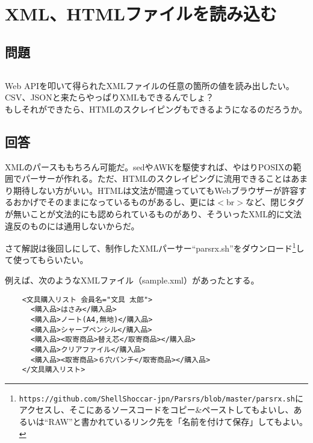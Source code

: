 \section{XML、HTMLファイルを読み込む}
\label{recipe:XML_parser}

\subsection*{問題}
\noindent
$\!\!\!\!\!$
\begin{grshfboxit}{160.0mm}
	Web APIを叩いて得られたXMLファイルの任意の箇所の値を読み出したい。CSV、JSONと来たらやっぱりXMLもできるんでしょ？\\
	もしそれができたら、HTMLのスクレイピングもできるようになるのだろうか。
\end{grshfboxit}

\subsection*{回答}
XMLのパースももちろん可能だ。sedやAWKを駆使すれば、やはりPOSIXの範囲でパーサーが作れる。ただ、HTMLのスクレイピングに流用できることはあまり期待しない方がいい。HTMLは文法が間違っていてもWebブラウザーが許容するおかげでそのままになっているものがあるし、更には$<$br$>$など、閉じタグが無いことが文法的にも認められているものがあり、そういったXML的に文法違反のものには通用しないからだ。

さて解説は後回しにして、制作したXMLパーサー``parsrx.sh''をダウンロード\footnote{\verb|https://github.com/ShellShoccar-jpn/Parsrs/blob/master/parsrx.sh|にアクセスし、そこにあるソースコードをコピー\&{}ペーストしてもよいし、あるいは``RAW''と書かれているリンク先を「名前を付けて保存」してもよい。}して使ってもらいたい。

例えば、次のようなXMLファイル（sample.xml）があったとする。\\
\begin{frameboxit}{160.0mm}
\begin{verbatim}
	<文具購入リスト 会員名="文具 太郎">
	  <購入品>はさみ</購入品>
	  <購入品>ノート(A4,無地)</購入品>
	  <購入品>シャープペンシル</購入品>
	  <購入品><取寄商品>替え芯</取寄商品></購入品>
	  <購入品>クリアファイル</購入品>
	  <購入品><取寄商品>６穴パンチ</取寄商品></購入品>
	</文具購入リスト>
\end{verbatim}
\end{frameboxit}

